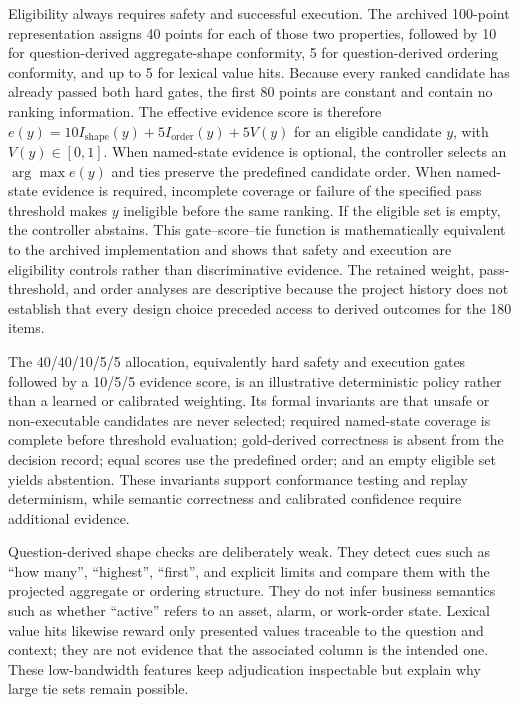 \documentclass[applsci,article,submit,moreauthors]{Definitions/mdpi}
\begin{document}
Eligibility always requires safety and successful execution. The archived 100-point representation assigns 40 points for each of those two properties, followed by 10 for question-derived aggregate-shape conformity, 5 for question-derived ordering conformity, and up to 5 for lexical value hits. Because every ranked candidate has already passed both hard gates, the first 80 points are constant and contain no ranking information. The effective evidence score is therefore $e(y)=10I_{\mathrm{shape}}(y)+5I_{\mathrm{order}}(y)+5V(y)$ for an eligible candidate $y$, with $V(y)\in[0,1]$. When named-state evidence is optional, the controller selects an $\arg\max e(y)$ and ties preserve the predefined candidate order. When named-state evidence is required, incomplete coverage or failure of the specified pass threshold makes $y$ ineligible before the same ranking. If the eligible set is empty, the controller abstains. This gate--score--tie function is mathematically equivalent to the archived implementation and shows that safety and execution are eligibility controls rather than discriminative evidence. The retained weight, pass-threshold, and order analyses are descriptive because the project history does not establish that every design choice preceded access to derived outcomes for the 180 items.

The 40/40/10/5/5 allocation, equivalently hard safety and execution gates followed by a 10/5/5 evidence score, is an illustrative deterministic policy rather than a learned or calibrated weighting. Its formal invariants are that unsafe or non-executable candidates are never selected; required named-state coverage is complete before threshold evaluation; gold-derived correctness is absent from the decision record; equal scores use the predefined order; and an empty eligible set yields abstention. These invariants support conformance testing and replay determinism, while semantic correctness and calibrated confidence require additional evidence.

Question-derived shape checks are deliberately weak. They detect cues such as ``how many'', ``highest'', ``first'', and explicit limits and compare them with the projected aggregate or ordering structure. They do not infer business semantics such as whether ``active'' refers to an asset, alarm, or work-order state. Lexical value hits likewise reward only presented values traceable to the question and context; they are not evidence that the associated column is the intended one. These low-bandwidth features keep adjudication inspectable but explain why large tie sets remain possible.
\end{document}
